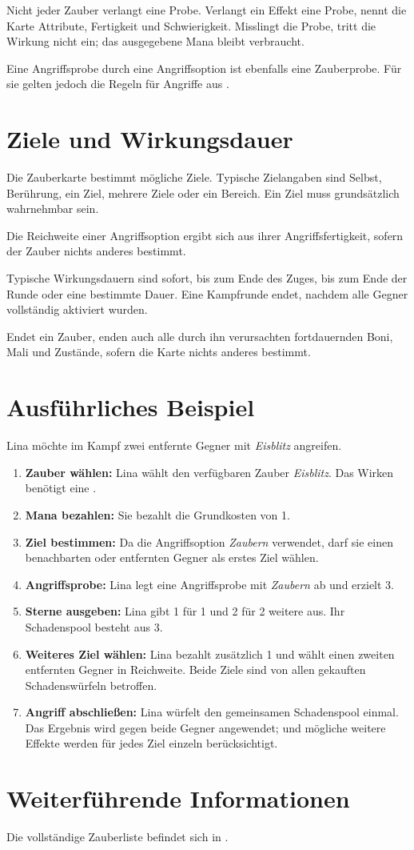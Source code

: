 Nicht jeder Zauber verlangt eine Probe. Verlangt ein Effekt eine Probe, nennt die Karte Attribute, Fertigkeit und Schwierigkeit. Misslingt die Probe, tritt die Wirkung nicht ein; das ausgegebene Mana bleibt verbraucht.

Eine Angriffsprobe durch eine Angriffsoption ist ebenfalls eine Zauberprobe. Für sie gelten jedoch die Regeln für Angriffe aus .

\section{Ziele und Wirkungsdauer}

Die Zauberkarte bestimmt mögliche Ziele. Typische Zielangaben sind Selbst, Berührung, ein Ziel, mehrere Ziele oder ein Bereich. Ein Ziel muss grundsätzlich wahrnehmbar sein.

Die Reichweite einer Angriffsoption ergibt sich aus ihrer Angriffsfertigkeit, sofern der Zauber nichts anderes bestimmt.

Typische Wirkungsdauern sind sofort, bis zum Ende des Zuges, bis zum Ende der Runde oder eine bestimmte Dauer. Eine Kampfrunde endet, nachdem alle Gegner vollständig aktiviert wurden.

Endet ein Zauber, enden auch alle durch ihn verursachten fortdauernden Boni, Mali und Zustände, sofern die Karte nichts anderes bestimmt.

\section{Ausführliches Beispiel}

Lina möchte im Kampf zwei entfernte Gegner mit \emph{Eisblitz} angreifen.

\begin{enumerate}
  \item \textbf{Zauber wählen:} Lina wählt den verfügbaren Zauber \emph{Eisblitz}. Das Wirken benötigt eine \standardAction.
  \item \textbf{Mana bezahlen:} Sie bezahlt die Grundkosten von 1\manaLoss.
  \item \textbf{Ziel bestimmen:} Da die Angriffsoption \emph{Zaubern} verwendet, darf sie einen benachbarten oder entfernten Gegner als erstes Ziel wählen.
  \item \textbf{Angriffsprobe:} Lina legt eine Angriffsprobe mit \emph{Zaubern} ab und erzielt 3\star.
  \item \textbf{Sterne ausgeben:} Lina gibt 1\star{} für 1\redDmgDie{} und 2\star{} für 2 weitere \redDmgDie{} aus. Ihr Schadenspool besteht aus 3\redDmgDie{}.
  \item \textbf{Weiteres Ziel wählen:} Lina bezahlt zusätzlich 1\manaLoss{} und wählt einen zweiten entfernten Gegner in Reichweite. Beide Ziele sind von allen gekauften Schadenswürfeln betroffen.
  \item \textbf{Angriff abschließen:} Lina würfelt den gemeinsamen Schadenspool einmal. Das Ergebnis wird gegen beide Gegner angewendet; \armor{} und mögliche weitere Effekte werden für jedes Ziel einzeln berücksichtigt.
\end{enumerate}

\section{Weiterführende Informationen}

Die vollständige Zauberliste befindet sich in .
